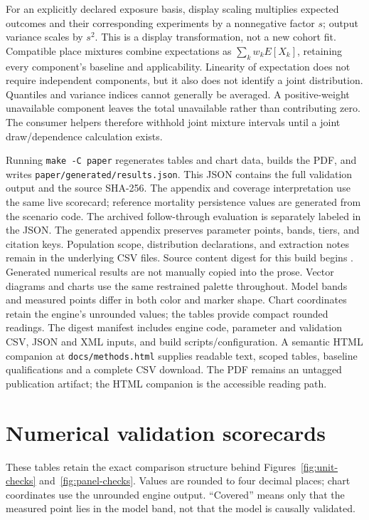 \documentclass[10pt]{article}
\begin{document}
For an explicitly declared exposure basis, display scaling multiplies expected
outcomes and their corresponding experiments by a nonnegative factor $s$;
output variance scales by $s^2$. This is a display transformation, not a new
cohort fit. Compatible place mixtures combine expectations as
$\sum_k w_k E[X_k]$, retaining every component's baseline and applicability.
Linearity of expectation does not require independent components, but it
also does not identify a joint distribution. Quantiles and variance indices
cannot generally be averaged. A positive-weight unavailable component leaves
the total unavailable rather than contributing zero. The consumer helpers
therefore withhold joint mixture intervals until a joint draw/dependence
calculation exists.

Running \texttt{make -C paper} regenerates tables and chart data, builds the PDF, and
writes \nolinkurl{paper/generated/results.json}. This JSON contains the
full validation output and the source SHA-256. The appendix
and coverage interpretation use the same live scorecard; reference
mortality persistence values are generated from the scenario code. The
archived follow-through evaluation is separately labeled in the JSON.
The generated appendix preserves parameter points, bands, tiers, and citation keys. Population
scope, distribution declarations, and extraction notes remain in the
underlying CSV files. Source content digest for this build begins
\texttt{\SourceDigest}. Generated numerical results are not manually
copied into the prose. Vector diagrams and charts use the same restrained
palette throughout. Model bands and measured points differ in both color
and marker shape. Chart coordinates retain the engine's unrounded values;
the tables provide compact rounded readings. The digest manifest includes engine code, parameter and validation CSV, JSON and XML inputs, and build scripts/configuration. A semantic HTML companion at \nolinkurl{docs/methods.html} supplies readable text, scoped tables, baseline qualifications and a complete CSV download. The PDF remains an untagged publication artifact; the HTML companion is the accessible reading path.

\clearpage
\appendix
\section{Numerical validation scorecards}\label{app:scorecards}
These tables retain the exact comparison structure behind
Figures~\ref{fig:unit-checks} and~\ref{fig:panel-checks}.
Values are rounded to four decimal places; chart coordinates use the
unrounded engine output. ``Covered'' means only that the measured point
lies in the model band, not that the model is causally validated.
\end{document}
